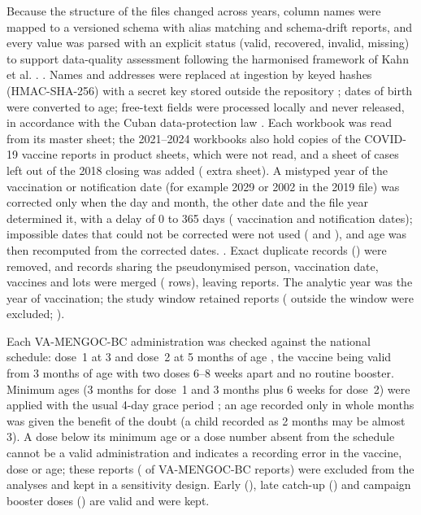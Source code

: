 \documentclass[11pt]{article}
\begin{document}
Because the structure of the files changed across years, column names were mapped to a
versioned schema with alias matching and schema-drift reports, and every value was parsed with
an explicit status (valid, recovered, invalid, missing) to support data-quality assessment
following the harmonised framework of Kahn et al. \cite{Kahn2016}. \VFormSentence. Names and addresses were
replaced at ingestion by keyed hashes (HMAC-SHA-256) with a secret key stored outside the
repository \cite{ENISA2019}; dates of birth were converted to age; free-text fields were
processed locally and never released, in accordance with the Cuban data-protection law
\cite{Ley149}. Each workbook was read from its master sheet; the 2021--2024 workbooks also hold
copies of the COVID-19 vaccine reports in product sheets, which were not read, and a sheet of
cases left out of the 2018 closing was added (\VNExtraSheets{} extra sheet). A mistyped year of
the vaccination or notification date (for example 2029 or 2002 in the 2019 file) was corrected
only when the day and month, the other date and the file year determined it, with a delay of
0 to 365 days (\VVaccYearImputed{} vaccination and \VNotifYearImputed{} notification dates);
impossible dates that could not be corrected were not used (\VVaccYearDropped{} and
\VNotifYearDropped), and age was then recomputed from the corrected dates.
\VPartialYearsSentence. Exact duplicate records (\VExactDuplicates) were removed, and records sharing the
pseudonymised person, vaccination date, vaccines and lots were merged (\VKeyDuplicatesMerged{}
rows), leaving \VReportsDedup{} reports. The analytic year was the year of vaccination; the study
window retained \VReportsInWindow{} reports (\VReportsOutsideWindow{} outside the window were
excluded; ).

Each VA-MENGOC-BC administration was checked against the national schedule: dose~1 at 3 and
dose~2 at 5 months of age \cite{SierraGonzalez2019}, the vaccine being valid from 3 months of
age with two doses 6--8 weeks apart and no routine booster. Minimum ages (3 months for dose~1 and
3 months plus 6 weeks for dose~2) were applied with the usual 4-day grace period
\cite{Kroger2023}; an age recorded only in whole months was given the benefit of the doubt (a
child recorded as 2 months may be almost 3). A dose below its minimum age or a dose number absent
from the schedule cannot be a valid administration and indicates a recording error in the
vaccine, dose or age; these \PONScheduleInvalid{} reports (\POPctScheduleInvalid{} of
VA-MENGOC-BC reports) were excluded from the analyses and kept in a sensitivity design. Early
(\PONScheduleEarly), late catch-up (\PONScheduleLate) and campaign booster doses
(\PONScheduleBooster) are valid and were kept.
\end{document}
